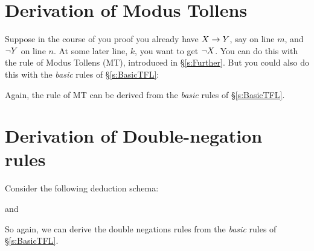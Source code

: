 \section{Derivation of Modus Tollens}
Suppose in the course of you proof you already have $X\rightarrow Y$, say on line $m$, and $\neg Y$ on line $n$. At some later line, $k$, you want to get $\neg X$.
 You can do this with the rule of Modus Tollens (MT), introduced in \S\ref{s:Further}. But you could also do this with the \emph{basic} rules of \S\ref{s:BasicTFL}:
\begin{pf}
		\open
		\close
\end{pf}
Again, the rule of MT can be derived from the \emph{basic} rules of \S\ref{s:BasicTFL}.



\section{Derivation of Double-negation rules}
Consider the following deduction schema:
\begin{pf}
	\open
	\close
{}
\end{pf}
and
\begin{pf}
	\open
	\close
{}
\end{pf}
So again,  we can derive the double negations rules from the \emph{basic} rules of \S\ref{s:BasicTFL}.




